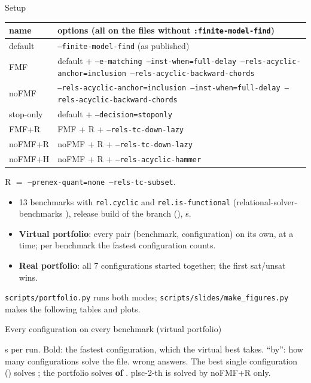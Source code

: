 \documentclass[aspectratio=169]{beamer}
\newcommand{\sm}[1]{\texttt{#1}}
\begin{document}
\begin{frame}{Setup}
  \scriptsize
  \begin{tabular}{@{}lL{11.8cm}@{}}
    \toprule
    name & options (all on the files without \sm{:finite-model-find}) \\
    \midrule
    default & \sm{--finite-model-find} (as published) \\
    FMF & default + \sm{--e-matching --inst-when=full-delay --rels-acyclic-anchor=inclusion --rels-acyclic-backward-chords} \\
    noFMF & \sm{--rels-acyclic-anchor=inclusion --inst-when=full-delay --rels-acyclic-backward-chords} \\
    stop-only & default + \sm{--decision=stoponly} \\
    FMF+R & FMF + R + \sm{--rels-tc-down-lazy} \\
    noFMF+R & noFMF + R + \sm{--rels-tc-down-lazy} \\
    noFMF+H & noFMF + R + \sm{--rels-acyclic-hammer} \\
    \bottomrule
  \end{tabular}
  \smallskip

  R $=$ \sm{--prenex-quant=none --rels-tc-subset}.
  \smallskip

  \footnotesize
  \begin{itemize}
    \item 13 benchmarks with \sm{rel.cyclic} and \sm{rel.is-functional}
      (relational-solver-benchmarks \pfBench), release build of the branch (\pfCvc), \pfTimeout{} s.
    \item \textbf{Virtual portfolio}: every pair (benchmark, configuration) on its own, \pfJobs{}
      at a time; per benchmark the fastest configuration counts.
    \item \textbf{Real portfolio}: all 7 configurations started together; the first sat/unsat wins.
  \end{itemize}
  \sm{scripts/portfolio.py} runs both modes; \sm{scripts/slides/make\_figures.py} makes the
  following tables and plots.
\end{frame}

\begin{frame}{Every configuration on every benchmark (virtual portfolio)}
  \centering\tiny\setlength{\tabcolsep}{2.6pt}
  
  \medskip

  {\raggedright\scriptsize \pfTimeout{} s per run. Bold: the fastest configuration, which the
  virtual best takes. ``by'': how many configurations solve the file. \pfWrong{} wrong answers.
  The best single configuration (\pfBestSingleName) solves \pfBestSingle{}; the portfolio solves
  \textbf{\pfVirtual{} of \pfTotal}. plsc-2-th is solved by noFMF+R only.\par}
\end{frame}
\end{document}
